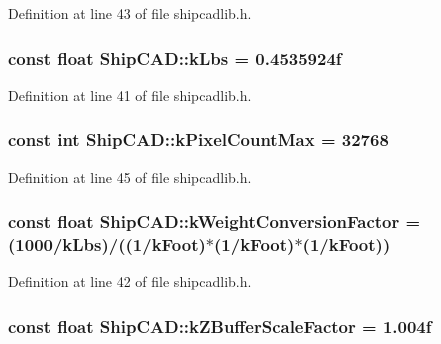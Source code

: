 Definition at line 43 of file shipcadlib.\-h.

\hypertarget{namespaceShipCAD_ad6937518d9742e268b279000d1e7a509}{
\subsubsection[{k\-Lbs}]{\setlength{\rightskip}{0pt plus 5cm}const float Ship\-C\-A\-D\-::k\-Lbs = 0.\-4535924f}}\label{namespaceShipCAD_ad6937518d9742e268b279000d1e7a509}


Definition at line 41 of file shipcadlib.\-h.

\hypertarget{namespaceShipCAD_ac8176e9d12f859826fb131b7febb8c8a}{
\subsubsection[{k\-Pixel\-Count\-Max}]{\setlength{\rightskip}{0pt plus 5cm}const int Ship\-C\-A\-D\-::k\-Pixel\-Count\-Max = 32768}}\label{namespaceShipCAD_ac8176e9d12f859826fb131b7febb8c8a}


Definition at line 45 of file shipcadlib.\-h.

\hypertarget{namespaceShipCAD_aa4319c8e7adfa68048f95c1614984036}{
\subsubsection[{k\-Weight\-Conversion\-Factor}]{\setlength{\rightskip}{0pt plus 5cm}const float Ship\-C\-A\-D\-::k\-Weight\-Conversion\-Factor = (1000/{\bf k\-Lbs})/((1/{\bf k\-Foot})$\ast$(1/{\bf k\-Foot})$\ast$(1/{\bf k\-Foot}))}}\label{namespaceShipCAD_aa4319c8e7adfa68048f95c1614984036}


Definition at line 42 of file shipcadlib.\-h.

\hypertarget{namespaceShipCAD_a519c591e5f5e3f60603b3133a4a2094e}{
\subsubsection[{k\-Z\-Buffer\-Scale\-Factor}]{\setlength{\rightskip}{0pt plus 5cm}const float Ship\-C\-A\-D\-::k\-Z\-Buffer\-Scale\-Factor = 1.\-004f}}\label{namespaceShipCAD_a519c591e5f5e3f60603b3133a4a2094e}


